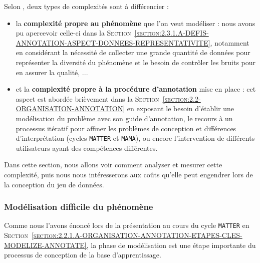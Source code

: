 		Selon \cite{baledent:2022:complexite-annotation-manuelle}, deux types de complexités sont à différencier :
		\begin{itemize}
			\item la \textbf{complexité propre au phénomène} que l'on veut modéliser :
			nous avons pu apercevoir celle-ci dans la \textsc{Section~\ref{section:2.3.1.A-DEFIS-ANNOTATION-ASPECT-DONNEES-REPRESENTATIVITE}}, notamment en considérant la nécessité de collecter une grande quantité de données pour représenter la diversité du phénomène et le besoin de contrôler les bruits pour en assurer la qualité, ...
			\item et la \textbf{complexité propre à la procédure d'annotation} mise en place :
			cet aspect est abordée brièvement dans la \textsc{Section~\ref{section:2.2-ORGANISATION-ANNOTATION}} en exposant le besoin d'établir une modélisation du problème avec son guide d'annotation, le recours à un processus itératif pour affiner les problèmes de conception et différences d'interprétation (cycles \texttt{MATTER} et \texttt{MAMA}), ou encore l'intervention de différents utilisateurs ayant des compétences différentes.
		\end{itemize}
		Dans cette section, nous allons voir comment analyser et mesurer cette complexité, puis nous nous intéresserons aux coûts qu'elle peut engendrer lors de la conception du jeu de données.
		
		
		\subsubsection{Modélisation difficile du phénomène}
		\label{section:2.3.2.A-DEFIS-ANNOTATION-ASPECT-COMPLEXITE-MODELISATION}
		
			Comme nous l'avons énoncé lors de la présentation au cours du cycle \texttt{MATTER} en \textsc{Section~\ref{section:2.2.1.A-ORGANISATION-ANNOTATION-ETAPES-CLES-MODELIZE-ANNOTATE}}, la phase de modélisation est une étape importante du processus de conception de la base d'apprentissage.
			
			
